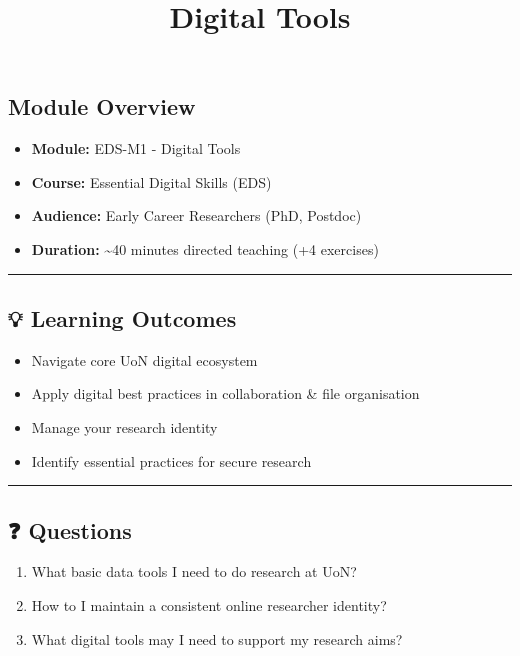 \documentclass[
  letterpaper,
  DIV=11,
  numbers=noendperiod]{scrartcl}
\title{Digital Tools}
\author{}
\date{}
\providecommand{\tightlist}{%
  \setlength{\itemsep}{0pt}\setlength{\parskip}{0pt}}
\begin{document}
\maketitle


\subsection{Module Overview}\label{module-overview}

\begin{itemize}
\tightlist
\item
  \textbf{Module:} EDS-M1 - Digital Tools
\item
  \textbf{Course:} Essential Digital Skills (EDS)
\item
  \textbf{Audience:} Early Career Researchers (PhD, Postdoc)\\
\item
  \textbf{Duration:} \textasciitilde40 minutes directed teaching (+4
  exercises)
\end{itemize}

\begin{center}\rule{0.5\linewidth}{0.5pt}\end{center}

\subsection{💡 Learning Outcomes}\label{learning-outcomes}

\begin{itemize}
\tightlist
\item
  Navigate core UoN digital ecosystem
\item
  Apply digital best practices in collaboration \& file organisation
\item
  Manage your research identity
\item
  Identify essential practices for secure research
\end{itemize}

\begin{center}\rule{0.5\linewidth}{0.5pt}\end{center}

\subsection{❓ Questions}\label{questions}

\begin{enumerate}
\def\labelenumi{\arabic{enumi}.}
\tightlist
\item
  What basic data tools I need to do research at UoN?
\item
  How to I maintain a consistent online researcher identity?
\item
  What digital tools may I need to support my research aims?\\
\end{enumerate}
\end{document}
